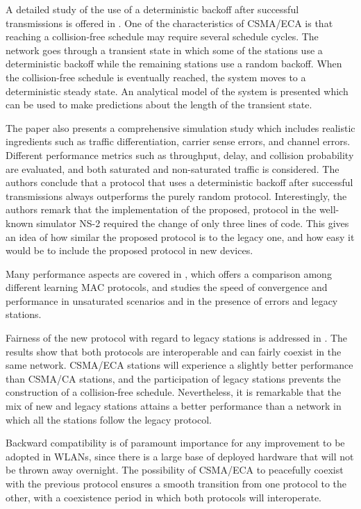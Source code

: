 \documentclass[journal]{IEEEtran}
\begin{document}
A detailed study of the use of a deterministic backoff after successful transmissions is offered in \cite{he2009srb}. 
One of the characteristics of CSMA/ECA is that reaching a collision-free schedule may require several schedule cycles.
The network goes through a transient state in which some of the stations use a deterministic backoff while the remaining stations use a random backoff.
When the collision-free schedule is eventually reached, the system moves to a deterministic steady state.
An analytical model of the system is presented \cite{he2009srb} which can be used to make predictions about the length of the transient state.

The paper also presents a comprehensive simulation study which includes realistic ingredients such as traffic differentiation, carrier sense errors, and channel errors.
Different performance metrics such as throughput, delay, and collision probability are evaluated, and both saturated and non-saturated traffic is considered.
The authors conclude that a protocol that uses a deterministic backoff after successful transmissions always outperforms the purely random protocol.
Interestingly, the authors remark that the implementation of the proposed, protocol in the well-known simulator NS-2 required the change of only three lines of code.
This gives an idea of how similar the proposed protocol is to the legacy one,  and how easy it would be to include the proposed protocol in new devices.

Many performance aspects are covered in \cite{fang2011dlm}, which offers a comparison among different learning MAC protocols, and studies the speed of convergence and performance in unsaturated scenarios and in the presence of errors and legacy stations.

Fairness of the new protocol with regard to legacy stations is addressed in \cite{barcelo2010fcc}.
The results show that both protocols are interoperable and can fairly coexist in the same network.
CSMA/ECA stations will experience a slightly better performance than CSMA/CA stations, and the participation of legacy stations prevents the construction of a collision-free schedule.
Nevertheless, it is remarkable that the mix of new and legacy stations attains a better performance than a network in which all the stations follow the legacy protocol.

Backward compatibility is of paramount importance for any improvement to be adopted in WLANs, since there is a large base of deployed hardware that will not be thrown away overnight.
The possibility of CSMA/ECA to peacefully coexist with the previous protocol ensures a smooth transition from one protocol to the other, with a coexistence period in which both protocols will interoperate.
\end{document}
